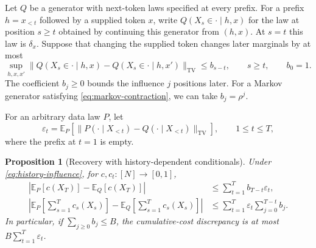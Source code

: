 \documentclass[11pt,twoside]{article}
\newcommand{\E}{\mathbb E}
\newcommand{\tv}[1]{\lVert #1\rVert_{\mathrm{TV}}}
\newtheorem{proposition}[theorem]{Proposition}
\theoremstyle{definition}
\theoremstyle{remark}
\begin{document}
Let \(Q\) be a generator with next-token laws specified at every prefix.
For a prefix \(h=x_{<t}\) followed by a supplied token \(x\), write
\(Q(X_s\in\cdot\mid h,x)\) for the law at position \(s\ge t\)
obtained by continuing this generator from \((h,x)\).
At \(s=t\) this law is \(\delta_x\).
Suppose that changing the supplied token changes later marginals by at most
\begin{equation}
 \sup_{h,x,x'}
 \tv{Q(X_s\in\cdot\mid h,x)-Q(X_s\in\cdot\mid h,x')}
 \le b_{s-t},\qquad s\ge t,\qquad b_0=1.
 \label{eq:history-influence}
\end{equation}
The coefficient \(b_j\ge0\) bounds the influence \(j\) positions later.
For a Markov generator satisfying \cref{eq:markov-contraction},
we can take \(b_j=\rho^j\).

For an arbitrary data law \(P\), let
\begin{equation}
 \varepsilon_t=
 \E_P\!\left[
 \tv{P(\cdot\mid X_{<t})-Q(\cdot\mid X_{<t})}
 \right],\qquad 1\le t\le T,
 \label{eq:history-local-error}
\end{equation}
where the prefix at \(t=1\) is empty.

\begin{proposition}[Recovery with history-dependent conditionals]
\label{prop:history-recovery}
Under \cref{eq:history-influence}, for \(c,c_t:[N]\to[0,1]\),
\begin{align}
 \left|\E_P[c(X_T)]-\E_Q[c(X_T)]\right|
 &\le\sum_{t=1}^T b_{T-t}\varepsilon_t,
 \label{eq:history-terminal}\\
 \left|\E_P\!\left[\sum_{s=1}^T c_s(X_s)\right]
       -\E_Q\!\left[\sum_{s=1}^T c_s(X_s)\right]\right|
 &\le\sum_{t=1}^T\varepsilon_t\sum_{j=0}^{T-t}b_j.
 \label{eq:history-cumulative}
\end{align}
In particular, if \(\sum_{j\ge0}b_j\le B\), the cumulative-cost
discrepancy is at most \(B\sum_{t=1}^T\varepsilon_t\).
\end{proposition}
\end{document}
